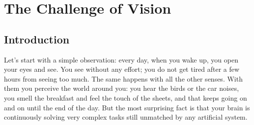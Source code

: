 %	
%	
%	 
%



\chapter{The Challenge of Vision}
\label{chap:challenge_of_vision}




\section{Introduction}

Let's start with a simple observation: every day, when you wake up, you open your eyes and see. You see without any effort; you do not get tired after a few hours from seeing too much. The same happens with all the other senses. With them you perceive the world around you: you hear the birds or the car noises, you smell the breakfast and feel the touch of the sheets, and that keeps going on and on until the end of the day. But the most surprising fact is that your brain is continuously solving very complex tasks still unmatched by any artificial system.

